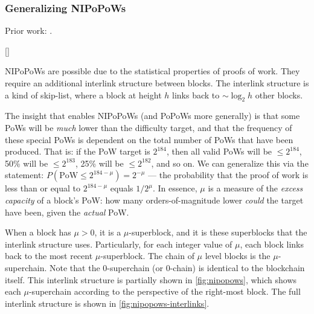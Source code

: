 \subsubsection{Generalizing NIPoPoWs}



Prior work: \citeNIPoPoWsFull{}.

[\citeNipopowWhatLink{}]

NIPoPoWs are possible due to the statistical properties of proofs of work.
They require an additional interlink structure between blocks.
The interlink structure is a kind of skip-list, where a block at height $h$ links back to $\sim \log_2 h$ other blocks.

The insight that enables NIPoPoWs (and PoPoWs more generally) is that some PoWs will be \emph{much} lower than the difficulty target, and that the frequency of these special PoWs is dependent on the total number of PoWs that have been produced.
That is: if the PoW target is $2^{184}$, then all valid PoWs will be $\le 2^{184}$, 50\% will be $\le 2^{183}$, 25\% will be $\le 2^{182}$, and so on.
We can generalize this via the statement: $P(\text{PoW} \le 2^{184 - \mu}) = 2^{-\mu}$ --- the probability that the proof of work is less than or equal to $2^{184-\mu}$ equals $1/2^\mu$.
In essence, $\mu$ is a measure of the \emph{excess capacity} of a block's PoW: how many orders-of-magnitude lower \emph{could} the target have been, given the \emph{actual} PoW.

When a block has $\mu > 0$, it is a $\mu$-superblock, and it is these superblocks that the interlink structure uses.
Particularly, for each integer value of $\mu$, each block links back to the most recent $\mu$-superblock.
The chain of $\mu$ level blocks is the $\mu$-superchain.
Note that the 0-superchain (or 0-chain) is identical to the blockchain itself.
This interlink structure is partially shown in \autoref{fig:nipopows}, which shows each $\mu$-superchain according to the perspective of the right-most block.
The full interlink structure is shown in \autoref{fig:nipopows-interlinks}.

